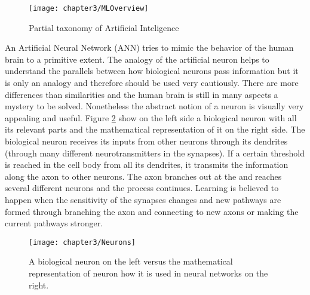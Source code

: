 \begin{figure}[H]
  \centering
  \caption{Partial taxonomy of Artificial Inteligence \cite{alom2018history}}
  \texttt{[image: chapter3/MLOverview]}
  \label{fig:MLOverview}
\end{figure}

An Artificial Neural Network (ANN) tries to mimic the behavior of the human brain to a primitive extent. The analogy of the artificial neuron helps to understand the parallels between how biological neurons pass information but it is only an analogy and therefore should be used very cautiously. There are more differences than similarities and the human brain is still in many aspects a mystery to be solved. Nonetheless the abstract notion of a neuron is visually very appealing and useful. Figure \ref{fig:Neurons} show on the left side a biological neuron with all its relevant parts and the mathematical representation of it on the right side. The biological neuron receives its inputs from other neurons through its dendrites (through many different neurotransmitters in the synapses). If a certain threshold is reached in the cell body from all its dendrites, it transmits the information along the axon to other neurons. The axon branches out at the and reaches several different neurons and the process continues. Learning is believed to happen when the sensitivity of the synapses changes and new pathways are formed through branching the axon and connecting to new axons or making the current pathways stronger.

\begin{figure}[H]
  \centering
  \caption{A biological neuron on the left versus the mathematical representation of neuron how it is used in neural networks on the right. \cite{cs231neuralnetworks}}
  \texttt{[image: chapter3/Neurons]}
  \label{fig:Neurons}
\end{figure}

